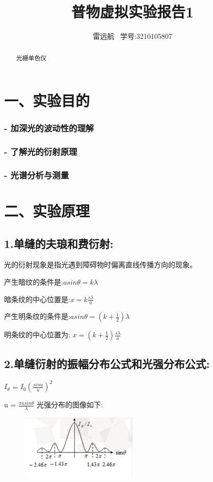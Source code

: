 \documentclass{article}
\title{普物虚拟实验报告1}
\author{雷远航 \ 学号:3210105807}
\begin{document}
\maketitle

\begin{abstract}
    光栅单色仪
\end{abstract}

\section*{一、实验目的}
\subsubsection*{- 加深光的波动性的理解}
\subsubsection*{- 了解光的衍射原理}
\subsubsection*{- 光谱分析与测量}



\section*{二、实验原理}

\subsection*{1.单缝的夫琅和费衍射:}
光的衍射现象是指光遇到障碍物时偏离直线传播方向的现象。

产生暗纹的条件是:$asin{\theta} = k{\lambda}$

暗条纹的中心位置是:$x = k\frac{s\lambda}{a}$

产生明条纹的条件是:$asin{\theta = (k + \frac{1}{2})\lambda}$

明条纹的中心位置为: $x = (k + \frac{1}{2}) \frac{s\lambda}{a}$

\subsection*{2.单缝衍射的振幅分布公式和光强分布公式:}

$I_{\theta}$ = $I_{0}$$(\frac{sinu}{u})^{2}$

u = $\frac{\pi asin\theta}{\lambda}$
光强分布的图像如下:
    \begin{figure}[H]
    \centering
    \includegraphics[width=0.5\textwidth]{1.png}
    \end{figure}
\end{document}
